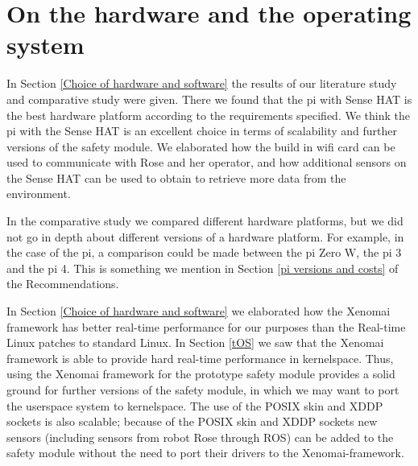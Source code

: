 \documentclass[12pt]{scrreprt}
\begin{document}
\section{On the hardware and the operating system}
In Section \ref{Choice of hardware and software} the results of our literature study and comparative study were given. There we found that the \gls{pi} with Sense HAT is the best hardware platform according to the requirements specified. We think the \gls{pi} with the Sense HAT is an excellent choice in terms of scalability and further versions of the safety module. We elaborated how the build in \gls{wifi} card can be used to communicate with Rose and her operator, and how additional sensors on the Sense HAT can be used to obtain to retrieve more data from the environment.
\par
In the comparative study we compared different hardware platforms, but we did not go in depth about different versions of a hardware platform. For example, in the case of the \gls{pi}, a comparison could be made between the \gls{pi} Zero W, the \gls{pi} 3 and the \gls{pi} 4. This is something we mention in Section \ref{pi versions and costs}  of the Recommendations.
\par
In Section \ref{Choice of hardware and software} we elaborated how the Xenomai framework has better real-time performance for our purposes than the Real-time Linux patches to standard Linux. In Section \ref{tOS} we saw that the Xenomai framework is able to provide hard real-time performance in kernelspace. Thus, using the Xenomai framework for the prototype safety module provides a solid ground for further versions of the safety module, in which we may want to port the userspace system to kernelspace. The use of the POSIX skin and XDDP sockets is also scalable; because of the POSIX skin and XDDP sockets new sensors (including sensors from robot Rose through ROS) can be added to the safety module without the need to port their drivers to the Xenomai-framework.
\end{document}

